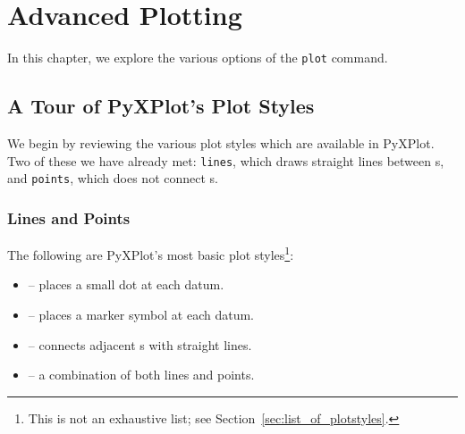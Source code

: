 %
%
%
%
%



\chapter{Advanced Plotting}
\label{ch:plotting}

In this chapter, we explore the various options of the {\tt plot} command.

\section{A Tour of PyXPlot's Plot Styles}

We begin by reviewing the various plot styles which are available in PyXPlot.
Two of these we have already met: {\tt lines}, which draws straight lines
between \datapoint s, and {\tt points}, which does not connect \datapoint s.

\subsection{Lines and Points}

The following are PyXPlot's most basic plot styles\footnote{This is not an
exhaustive list; see Section~\ref{sec:list_of_plotstyles}.}:
\begin{itemize}
\item {} -- places a small dot at each datum.
\item {} -- places a marker symbol at each datum.
\item {} -- connects adjacent \datapoint s with straight lines.
\item {} -- a combination of both lines and points.
\end{itemize}

